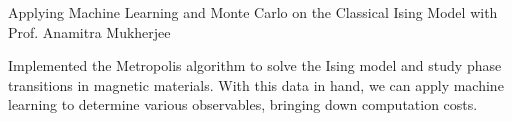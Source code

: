 





\cvachievement
{\faBook}
{Applying Machine Learning and Monte Carlo on the Classical Ising Model}
{with Prof. Anamitra Mukherjee}
\vspace{-5mm}
\begin{justify}
    Implemented the Metropolis algorithm to solve the Ising model and study phase transitions in magnetic materials. With this data in hand, we can apply machine learning to determine various observables, bringing down computation costs.
\end{justify}



